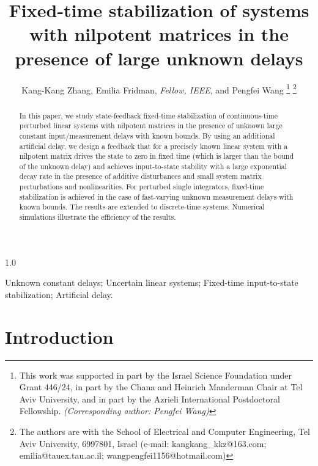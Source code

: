 \documentclass[journal]{IEEEtran}
\begin{document}
\begin{spacing}{1.0}
\title{Fixed-time stabilization of systems with nilpotent matrices in the presence of large unknown delays}
\author{Kang-Kang Zhang, Emilia Fridman, \textit{Fellow, IEEE}, and Pengfei Wang
\thanks{%
This work was supported in part by the Israel Science Foundation
under Grant 446/24, in part by the Chana and Heinrich Manderman
Chair at Tel Aviv University, and in part by the Azrieli International Postdoctoral Fellowship. \textit{(Corresponding author: Pengfei Wang)}}
\thanks{The authors are with the School of Electrical and Computer Engineering, Tel Aviv University, 6997801, Israel (e-mail: kangkang\_kkz@163.com; emilia@tauex.tau.ac.il; wangpengfei1156@hotmail.com)}
}
\maketitle

\begin{abstract}
In this paper, we study state-feedback fixed-time stabilization of continuous-time perturbed linear  systems with nilpotent matrices in the presence of unknown large constant input/measurement delays with known bounds. By using an additional artificial delay, we design a feedback that for a precisely known linear system with a nilpotent matrix drives the state to zero in fixed time (which is larger than the bound of the unknown delay) and achieves input-to-state stability with a large exponential decay rate in the presence of additive disturbances and small system matrix perturbations and nonlinearities. For perturbed single integrators, fixed-time stabilization is achieved in the case of fast-varying unknown measurement delays with known bounds. The results are extended to discrete-time systems. Numerical simulations illustrate the efficiency of the results.
\end{abstract}


\begin{IEEEkeywords}
Unknown constant delays;
Uncertain linear systems;
Fixed-time input-to-state stabilization;
Artificial delay.
\end{IEEEkeywords}
\IEEEpeerreviewmaketitle

\section{Introduction}


\end{spacing}
\end{document}
